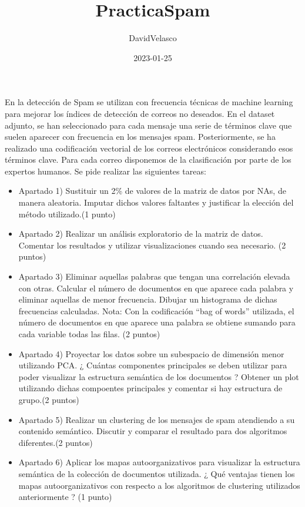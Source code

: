 \documentclass[
]{article}
\title{PracticaSpam}
\author{DavidVelasco}
\date{2023-01-25}
\begin{document}
\maketitle

En la detección de Spam se utilizan con frecuencia técnicas de machine
learning para mejorar los índices de detección de correos no deseados.
En el dataset adjunto, se han seleccionado para cada mensaje una serie
de términos clave que suelen aparecer con frecuencia en los mensajes
spam. Posteriormente, se ha realizado una codificación vectorial de los
correos electrónicos considerando esos términos clave. Para cada correo
disponemos de la clasificación por parte de los expertos humanos. Se
pide realizar las siguientes tareas:

\begin{itemize}
\item
  Apartado 1) Sustituir un 2\% de valores de la matriz de datos por NAs,
  de manera aleatoria. Imputar dichos valores faltantes y justificar la
  elección del método utilizado.(1 punto)
\item
  Apartado 2) Realizar un análisis exploratorio de la matriz de datos.
  Comentar los resultados y utilizar visualizaciones cuando sea
  necesario. (2 puntos)
\item
  Apartado 3) Eliminar aquellas palabras que tengan una correlación
  elevada con otras. Calcular el número de documentos en que aparece
  cada palabra y eliminar aquellas de menor frecuencia. Dibujar un
  histograma de dichas frecuencias calculadas. Nota: Con la codificación
  ``bag of words'' utilizada, el número de documentos en que aparece una
  palabra se obtiene sumando para cada variable todas las filas. (2
  puntos)
\item
  Apartado 4) Proyectar los datos sobre un subespacio de dimensión menor
  utilizando PCA. ¿ Cuántas componentes principales se deben utilizar
  para poder visualizar la estructura semántica de los documentos ?
  Obtener un plot utilizando dichas compoentes principales y comentar si
  hay estructura de grupo.(2 puntos)
\item
  Apartado 5) Realizar un clustering de los mensajes de spam atendiendo
  a su contenido semántico. Discutir y comparar el resultado para dos
  algoritmos diferentes.(2 puntos)
\item
  Apartado 6) Aplicar los mapas autoorganizativos para visualizar la
  estructura semántica de la colección de documentos utilizada. ¿ Qué
  ventajas tienen los mapas autoorganizativos con respecto a los
  algoritmos de clustering utilizados anteriormente ? (1 punto)
\end{itemize}
\end{document}
